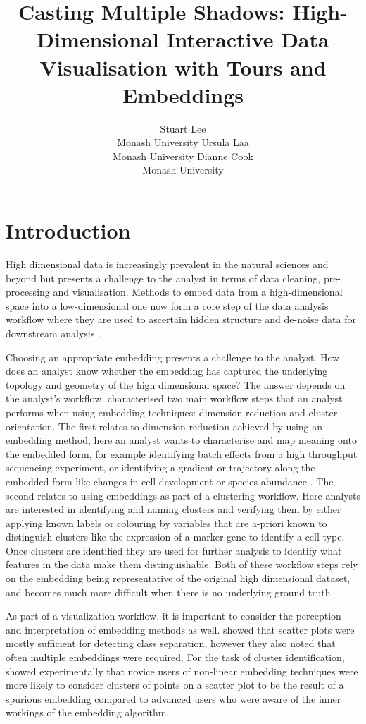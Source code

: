 \documentclass[article,notitle]{jdssv}
\author{
Stuart Lee\\Monash University \And Ursula Laa\\Monash University \And Dianne Cook\\Monash University
}
\title{Casting Multiple Shadows: High-Dimensional Interactive Data Visualisation with Tours and Embeddings}
\begin{document}
\hypertarget{introduction}{%
\section{Introduction}\label{introduction}}

High dimensional data is increasingly prevalent in the natural sciences and
beyond but presents a challenge to the analyst in terms of data cleaning,
pre-processing and visualisation. Methods to embed data from a high-dimensional
space into a low-dimensional one now form a core step of the data analysis
workflow where they are used to ascertain hidden structure and de-noise data
for downstream analysis .

Choosing an appropriate embedding presents a challenge to the analyst. How does
an analyst know whether the embedding has captured the underlying topology and
geometry of the high dimensional space? The answer depends on the analyst's
workflow. \citet{Brehmer2014-hk} characterised two main workflow steps that an
analyst performs when using embedding techniques: dimension reduction and
cluster orientation. The first relates to dimension reduction achieved by using
an embedding method, here an analyst wants to characterise and map meaning onto
the embedded form, for example identifying batch effects from a high throughput
sequencing experiment, or identifying a gradient or trajectory along the
embedded form like changes in cell development or species abundance \citep{Nguyen2019-yh}. The second relates to using embeddings as part of
a clustering workflow. Here analysts are interested in identifying and naming
clusters and verifying them by either applying known labels or colouring by
variables that are a-priori known to distinguish clusters like the expression of a marker gene to identify a cell type. Once clusters are identified they are used for further analysis to identify what features in the data make them distinguishable. Both of these
workflow steps rely on the embedding being representative of the original high dimensional dataset, and becomes much more difficult when there is no underlying ground truth.

As part of a visualization workflow, it is important to consider the perception
and interpretation of embedding methods as well. \citet{Sedlmair2013-pn} showed that
scatter plots were mostly sufficient for detecting class separation, however
they also noted that often multiple embeddings were required. For the task of
cluster identification, \citet{Lewis2012-ai} showed experimentally that novice users
of non-linear embedding techniques were more likely to consider clusters of
points on a scatter plot to be the result of a spurious embedding compared
to advanced users who were aware of the inner workings of the embedding
algorithm.
\end{document}
